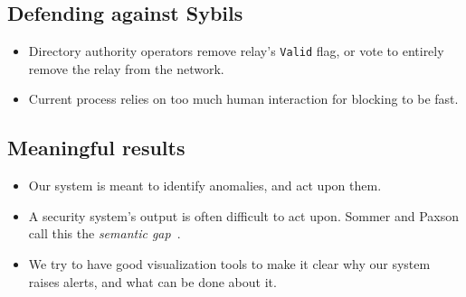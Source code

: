 \subsection{Defending against Sybils}
\begin{itemize}
	\item Directory authority operators remove relay's \texttt{Valid} flag, or
		vote to entirely remove the relay from the network.

	\item Current process relies on too much human interaction for blocking to
		be fast.
\end{itemize}

\subsection{Meaningful results}
\begin{itemize}
	\item Our system is meant to identify anomalies, and act upon them.

	\item A security system's output is often difficult to act upon.  Sommer
		and Paxson call this the \emph{semantic gap}~\cite[\S
		III.C]{Sommer2010a}.

	\item We try to have good visualization tools to make it clear why our
		system raises alerts, and what can be done about it.
\end{itemize}
